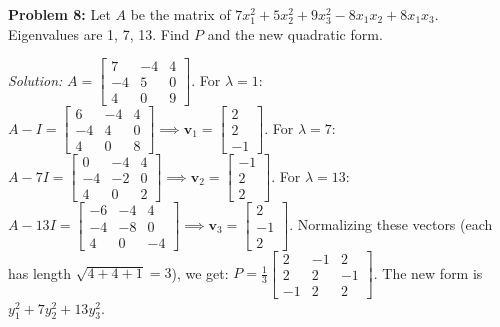 \documentclass[11pt, letterpaper]{article}
\theoremstyle{definition}
\theoremstyle{remark}
\begin{document}
\textbf{Problem 8:} Let $A$ be the matrix of $7x_1^2 + 5x_2^2 + 9x_3^2 - 8x_1 x_2 + 8x_1 x_3$. Eigenvalues are 1, 7, 13. Find $P$ and the new quadratic form.

\textit{Solution:}
$A = \begin{bmatrix} 7 & -4 & 4 \\ -4 & 5 & 0 \\ 4 & 0 & 9 \end{bmatrix}$.
For $\lambda = 1$: $A - I = \begin{bmatrix} 6 & -4 & 4 \\ -4 & 4 & 0 \\ 4 & 0 & 8 \end{bmatrix} \implies \mathbf{v}_1 = \begin{bmatrix} 2 \\ 2 \\ -1 \end{bmatrix}$.
For $\lambda = 7$: $A - 7I = \begin{bmatrix} 0 & -4 & 4 \\ -4 & -2 & 0 \\ 4 & 0 & 2 \end{bmatrix} \implies \mathbf{v}_2 = \begin{bmatrix} -1 \\ 2 \\ 2 \end{bmatrix}$.
For $\lambda = 13$: $A - 13I = \begin{bmatrix} -6 & -4 & 4 \\ -4 & -8 & 0 \\ 4 & 0 & -4 \end{bmatrix} \implies \mathbf{v}_3 = \begin{bmatrix} 2 \\ -1 \\ 2 \end{bmatrix}$.
Normalizing these vectors (each has length $\sqrt{4+4+1} = 3$), we get:
$P = \frac{1}{3} \begin{bmatrix} 2 & -1 & 2 \\ 2 & 2 & -1 \\ -1 & 2 & 2 \end{bmatrix}$. The new form is $y_1^2 + 7y_2^2 + 13y_3^2$.
\end{document}
